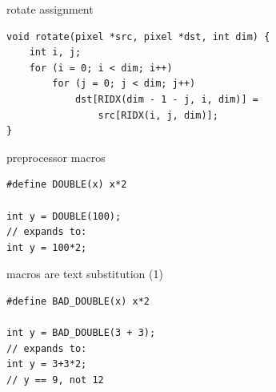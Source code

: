 \begin{frame}[fragile,label=rotate]{rotate assignment}
\lstset{
    language=C,style=smaller,
}
    \vspace{-.25cm}
\begin{lstlisting}
void rotate(pixel *src, pixel *dst, int dim) {
    int i, j;
    for (i = 0; i < dim; i++)
        for (j = 0; j < dim; j++)
            dst[RIDX(dim - 1 - j, i, dim)] =
                src[RIDX(i, j, dim)];
}
\end{lstlisting}
\end{frame}

\begin{frame}[fragile,label=MacrosExplain1]{preprocessor macros}
\lstset{
    language=C,style=small,
}
\begin{lstlisting}
#define DOUBLE(x) x*2

int y = DOUBLE(100);
// expands to:
int y = 100*2;
\end{lstlisting}
\end{frame}

\begin{frame}[fragile,label=MacrosExplain2]{macros are text substitution (1)}
\lstset{
    language=C,style=small,
}
\begin{lstlisting}
#define BAD_DOUBLE(x) x*2

int y = BAD_DOUBLE(3 + 3);
// expands to:
int y = 3+3*2;
// y == 9, not 12
\end{lstlisting}
\end{frame}


